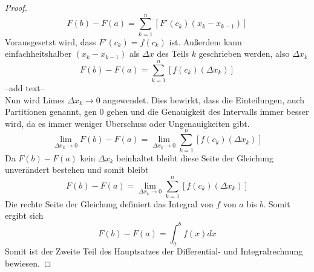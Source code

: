 \documentclass[fontsize=12pt,paper=a4,DIV12,cleardoublepage=empty, 
liststotoc,idxtotoc,bibtotoc]{article}
\theoremstyle{plain}
\theoremstyle{definition}
\begin{document}
\begin{proof}
\begin{equation*}
		F(b)-F(a)=\sum_{k=1}^{n} [F'(c_k)(x_k-x_{k-1})]
	\end{equation*}
	Vorausgesetzt wird, dass $F'(c_k)=f(c_k)$ ist. Außerdem kann einfachheitshalber $(x_k-x_{k-1})$ als $\Delta x$ des Teils $k$ geschrieben werden, also $\Delta x_k$
	\begin{equation}
		F(b)-F(a)=\sum_{k=1}^{n} [f(c_k)(\Delta x_k)]
	\end{equation}
	--add text--\\
	Nun wird Limes $\Delta x_k \to 0$ angewendet. Dies bewirkt, dass die Einteilungen, auch Partitionen genannt, gen 0 gehen und die Genauigkeit des Intervalls immer besser wird, da es immer weniger Überschuss oder Ungenauigkeiten gibt.
	\begin{equation*}
		\lim \limits_{\Delta x_k \to 0} F(b)-F(a)=\lim \limits_{\Delta x_k \to 0} \sum_{k=1}^{n} [f(c_k)(\Delta x_k)]
	\end{equation*}
	Da $F(b)-F(a)$ kein $\Delta x_k$ beinhaltet bleibt diese Seite der Gleichung unverändert bestehen und somit bleibt
	\begin{equation*}
		F(b)-F(a)=\lim \limits_{\Delta x_k \to 0} \sum_{k=1}^{n} [f(c_k)(\Delta x_k)]
	\end{equation*}
	Die rechte Seite der Gleichung definiert das Integral von $f$ von $a$ bis $b$. Somit ergibt sich
	\begin{equation*}
		F(b)-F(a)=\int_{a}^{b}f(x)dx
	\end{equation*}
	Somit ist der Zweite Teil des Hauptsatzes der Differential- und Integralrechnung bewiesen.
	\end{proof}
	
	
	
	\newpage
	
	
	\nocite{*}
	\printbibliography[title=Literaturverzeichnis]
\end{document}
